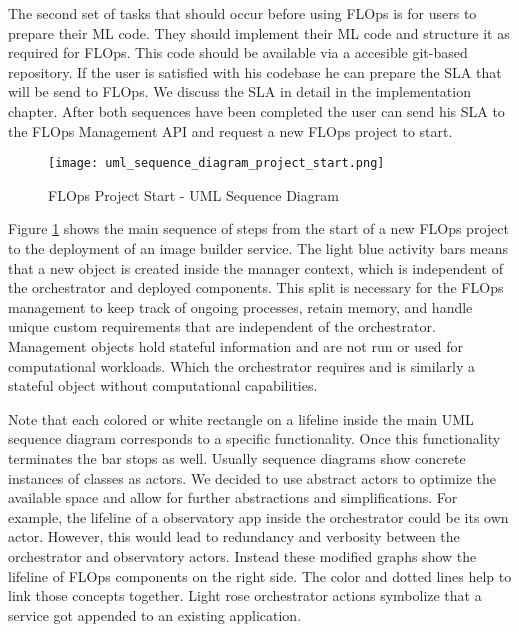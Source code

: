 The second set of tasks that should occur before using FLOps is for users to prepare their ML code.
They should implement their ML code and structure it as required for FLOps.
This code should be available via a accesible git-based repository.
If the user is satisfied with his codebase he can prepare the SLA that will be send to FLOps.
We discuss the SLA in detail in the implementation chapter.
After both sequences have been completed the user can send his SLA to the FLOps Management API and request a new FLOps project to start.


\begin{figure}[h]
    \begin{adjustwidth}{-0.2\paperwidth}{-0.2\paperwidth}
        \centering
        \texttt{[image: uml\_sequence\_diagram\_project\_start.png]}
        \caption{FLOps Project Start - UML Sequence Diagram}
        \label{fig:uml_sequence_project_start}
    \end{adjustwidth}
\end{figure}

Figure \ref{fig:uml_sequence_project_start} shows the main sequence of steps from the start of a new FLOps project to the deployment of an image builder service.
The light blue activity bars means that a new object is created inside the manager context, which is independent of the orchestrator and deployed components.
This split is necessary for the FLOps management to keep track of ongoing processes, retain memory, and handle unique custom requirements that are independent of the orchestrator.
Management objects hold stateful information and are not run or used for computational workloads.
Which the orchestrator requires and is similarly a stateful object without computational capabilities.

Note that each colored or white rectangle on a lifeline inside the main UML sequence diagram corresponds to a specific functionality.
Once this functionality terminates the bar stops as well.
Usually sequence diagrams show concrete instances of classes as actors.
We decided to use abstract actors to optimize the available space and allow for further abstractions and simplifications.
For example, the lifeline of a observatory app inside the orchestrator could be its own actor.
However, this would lead to redundancy and verbosity between the orchestrator and observatory actors.
Instead these modified graphs show the lifeline of FLOps components on the right side.
The color and dotted lines help to link those concepts together.
Light rose orchestrator actions symbolize that a service got appended to an existing application.

